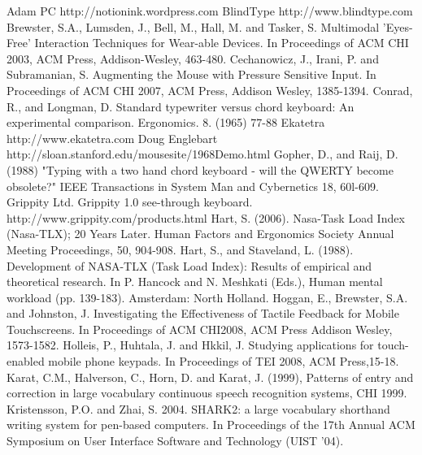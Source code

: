 \documentclass{chi2011}
\begin{document}












\begin{thebibliography}{9}
 Adam PC http://notionink.wordpress.com
 BlindType http://www.blindtype.com
 Brewster, S.A., Lumsden, J., Bell, M., Hall, M. and Tasker, S. Multimodal 'Eyes-Free' Interaction Techniques for Wear-able Devices. In Proceedings of ACM CHI 2003, ACM Press, Addison-Wesley, 463-480.
 Cechanowicz, J., Irani, P. and Subramanian, S. Augmenting the Mouse with Pressure Sensitive Input. In Proceedings of ACM CHI 2007, ACM Press, Addison Wesley, 1385-1394.
 Conrad, R., and Longman, D. Standard typewriter versus chord keyboard: An experimental comparison. Ergonomics. 8. (1965) 77-88
 Ekatetra http://www.ekatetra.com
 Doug Englebart http://sloan.stanford.edu/mousesite/1968Demo.html
 Gopher, D., and Raij, D. (1988) "Typing with a two hand chord keyboard - will the QWERTY become obsolete?" IEEE Transactions in System Man and Cybernetics 18, 60l-609. 
 Grippity Ltd. Grippity 1.0 see-through keyboard. http://www.grippity.com/products.html  
 Hart, S. (2006). Nasa-Task Load Index (Nasa-TLX); 20 Years Later. Human Factors and Ergonomics Society Annual Meeting Proceedings, 50, 904-908.
 Hart, S., and Staveland, L. (1988). Development of NASA-TLX (Task Load Index): Results of empirical and theoretical research. In P. Hancock and N. Meshkati (Eds.), Human mental workload (pp. 139-183). Amsterdam: North Holland.
 Hoggan, E., Brewster, S.A. and Johnston, J. Investigating the Effectiveness of Tactile Feedback for Mobile Touchscreens. In Proceedings of ACM CHI2008, ACM Press Addison Wesley, 1573-1582.
 Holleis, P., Huhtala, J. and Hkkil, J. Studying applications for touch-enabled mobile phone keypads. In Proceedings of TEI 2008, ACM Press,15-18.
 Karat, C.M., Halverson, C., Horn, D. and Karat, J. (1999), Patterns of entry and correction in large vocabulary continuous speech recognition systems, CHI 1999.
 Kristensson, P.O. and Zhai, S. 2004. SHARK2: a large vocabulary shorthand writing system for pen-based computers. In Proceedings of the 17th Annual ACM Symposium on User Interface Software and Technology (UIST '04).

\end{thebibliography}
\end{document}
